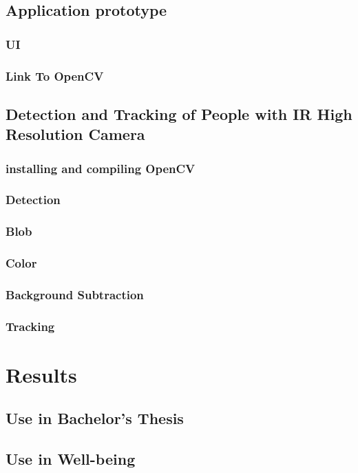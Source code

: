 \documentclass[hidelinks,11pt,a4paper,oneside,article]{memoir}
\begin{document}
\section{Application prototype}
\subsection*{UI}
\subsection*{Link To OpenCV}

\section{Detection and Tracking of People with IR High Resolution Camera}
\subsection*{installing and compiling OpenCV}
\subsection*{Detection}
\subsection*{Blob}
\subsection*{Color}
\subsection*{Background Subtraction}
\subsection*{Tracking}

\clearpage
\chapter{Results}
\section{Use in Bachelor's Thesis}
\section{Use in Well-being}
\end{document}
